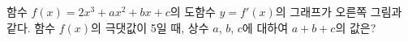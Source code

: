 \noindent\begin{minipage}[t]{0.58\linewidth}\vspace{0pt}\raggedright 함수 $f(x)=2x^3+ax^2+bx+c$의 도함수 $y=f'(x)$의 그래프가 오른쪽 그림과 같다. 함수 $f(x)$의 극댓값이 5일 때, 상수 $a$, $b$, $c$에 대하여 $a+b+c$의 값은?\end{minipage}\hfill\begin{minipage}[t]{0.4\linewidth}\vspace{0pt}\centering \resizebox{\ifdim\width>\linewidth\linewidth\else\width\fi}{!}{}\end{minipage}\par
{}
